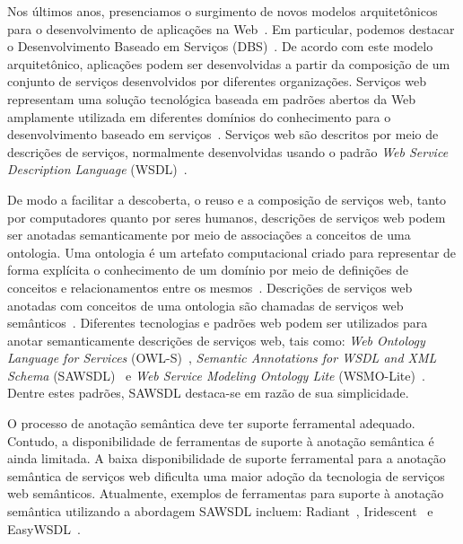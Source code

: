 Nos últimos anos, presenciamos o surgimento de novos modelos arquitetônicos para o desenvolvimento de aplicações na Web~\cite{PAPAZOGLOU-GEORGAKOPOULOS-2003-Service-Oriented-Computing}. Em particular, podemos destacar o Desenvolvimento Baseado em Serviços (DBS)~\cite{IEEE-2011-ARQUITETURA, SOA-MANIFESTO-2013, IBM-2019-SOA}. De acordo com este modelo arquitetônico, aplicações podem ser desenvolvidas a partir da composição de um conjunto de serviços desenvolvidos por diferentes organizações. Serviços web representam uma solução tecnológica baseada em padrões abertos da Web amplamente utilizada em diferentes domínios do conhecimento para o desenvolvimento baseado em serviços~\cite{DUTTA-2017-Online-Census,GUARDIA-FARIAS-2017-SemantiSCo,KACI-2018-Mobile-Road-Safety,OYUCU-POLATI-2018-Online-Video-Content-Analysis-System,HUANG-JAYARAMAN-MORSHED-2019-Sens-E-Montion}. Serviços web são descritos por meio de descrições de serviços, normalmente desenvolvidas usando o padrão \textit{Web Service Description Language} (WSDL)~\cite{W3C-2007-WSDL}.

De modo a facilitar a descoberta, o reuso e a composição de serviços web, tanto por computadores quanto por seres humanos, descrições de serviços web podem ser anotadas semanticamente por meio de associações a conceitos de uma ontologia. Uma ontologia é um artefato computacional criado para representar de forma explícita o conhecimento de um domínio por meio de definições de conceitos e relacionamentos entre os mesmos~\cite{GRUBER-1993-Ontologies}. Descrições de serviços web anotadas com conceitos de uma ontologia são chamadas de serviços web semânticos~\cite{CARDOSO-2006-Semantic-Web-Services}. Diferentes tecnologias e padrões web podem ser utilizados para anotar semanticamente descrições de serviços web, tais como: \textit{Web Ontology Language for Services} (OWL-S)~\cite{W3C-2004-OWL-S}, \textit{Semantic Annotations for WSDL and XML Schema} (SAWSDL)~\cite{W3C-2007-SAWSDL} e \textit{Web Service Modeling Ontology Lite} (WSMO-Lite)~\cite{W3C-2010-WSMO-Lite}. Dentre estes padrões, SAWSDL destaca-se em razão de sua simplicidade.


O processo de anotação semântica deve ter suporte ferramental adequado. Contudo, a disponibilidade de ferramentas de suporte à anotação semântica é ainda limitada. A baixa disponibilidade de suporte ferramental para a anotação semântica de serviços web dificulta uma maior adoção da tecnologia de serviços web semânticos. Atualmente, exemplos de ferramentas para suporte à anotação semântica utilizando a abordagem SAWSDL incluem: Radiant~\cite{BELHAJJAME-EMBURY-2014-Radiant}, Iridescent~\cite{STAVROPOULOS-2013-Iridescent} e EasyWSDL~\cite{EasySAWSDL-2016}.

